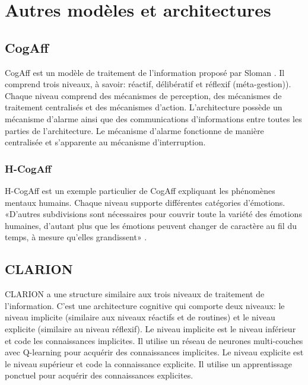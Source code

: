 
\chapter{Autres modèles et architectures} %

\label{Chapter5} %


\section{CogAff}

CogAff est un modèle de traitement de l'information proposé par Sloman \parencite{sloman2005architectural}. Il comprend trois niveaux, à savoir: réactif, délibératif et réflexif (méta-gestion)). 
Chaque niveau comprend des mécanismes de perception, des mécanismes de traitement centralisés et des mécanismes d'action. L'architecture possède un mécanisme d'alarme ainsi que des communications d'informations entre toutes les parties de l'architecture. Le mécanisme d'alarme fonctionne de manière centralisée et s'apparente au mécanisme d'interruption.





\subsection{H-CogAff}

H-CogAff est un exemple particulier de CogAff expliquant les phénomènes mentaux humains. Chaque niveau supporte différentes catégories d'émotions. «D'autres subdivisions sont nécessaires pour couvrir toute la variété des émotions humaines, d'autant plus que les émotions peuvent changer de caractère au fil du temps, à mesure qu'elles grandissent» \parencite{sloman2005architectural}.


\section{CLARION}

CLARION a une structure similaire aux trois niveaux de traitement de l’information. C'est une architecture cognitive qui comporte deux niveaux: le niveau implicite (similaire aux niveaux réactifs et de routines) et le niveau explicite (similaire au niveau réflexif). Le niveau implicite est le niveau inférieur et code les connaissances implicites. Il utilise un réseau de neurones multi-couches avec Q-learning pour acquérir des connaissances implicites. Le niveau explicite est le niveau supérieur et code la connaissance explicite. Il utilise un apprentissage ponctuel pour acquérir des connaissances explicites.

